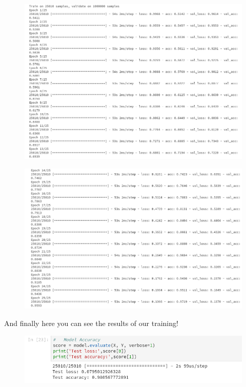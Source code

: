 \documentclass[11pt]{article}
\makeatletter
\def\maxwidth{\ifdim\Gin@nat@width>\linewidth\linewidth
    \else\Gin@nat@width\fi}
\let\Oldincludegraphics\includegraphics
\renewcommand{\includegraphics}[1]{\Oldincludegraphics[width=.8\maxwidth]{#1}}
\makeatother
\begin{document}
    \begin{figure}[htbp]
\centering
\includegraphics{train_FFNN_2.png}
\caption{}
\end{figure}

    \begin{figure}[htbp]
\centering
\includegraphics{train_FFNN_3.png}
\caption{}
\end{figure}

    And finally here you can see the results of our training!

    \begin{figure}[htbp]
\centering
\includegraphics{results_FFNN.png}
\caption{}
\end{figure}
\end{document}
